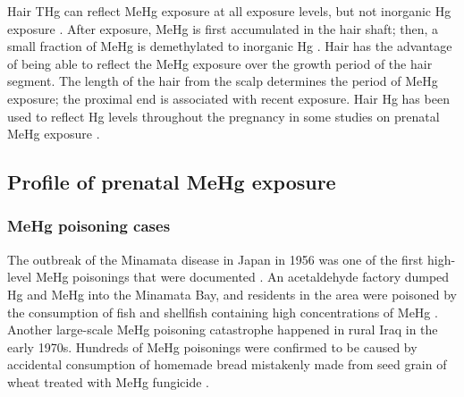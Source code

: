 Hair THg can reflect MeHg exposure at all exposure levels, but not inorganic Hg exposure \citep{lindberg2004exposure,berglund2005inter,clarkson2006toxicology}. After exposure, MeHg is first accumulated in the hair shaft; then, a small fraction of MeHg is demethylated to inorganic Hg \citep{berglund2005inter}. Hair has the advantage of being able to reflect the MeHg exposure over the growth period of the hair segment. The length of the hair from the scalp determines the period of MeHg
exposure; the proximal end is associated with recent exposure. Hair Hg has been used to reflect Hg levels throughout the pregnancy in some studies on prenatal MeHg exposure \citep{clarkson2006toxicology}.

\subsection{Profile of prenatal MeHg exposure}

\subsubsection{MeHg poisoning cases}

The outbreak of the Minamata disease in Japan in 1956 was one of the first high-level MeHg poisonings that were documented \citep{kurland1962minamata,harada1995minamata}. An acetaldehyde factory dumped Hg and MeHg into the Minamata Bay, and residents in the area were poisoned by the consumption of fish and shellfish containing high concentrations of MeHg \citep{harada1995minamata}. Another large-scale MeHg poisoning catastrophe happened in rural Iraq in the early 1970s. Hundreds of MeHg poisonings were confirmed to be caused by accidental consumption of homemade bread mistakenly made from seed grain of wheat treated with MeHg fungicide \citep{bakir1973methylmercury}. 

